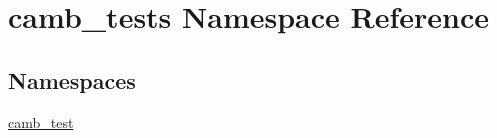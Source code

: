 \hypertarget{namespacecamb__tests}{}\section{camb\+\_\+tests Namespace Reference}
\label{namespacecamb__tests}
\subsection*{Namespaces}
\begin{DoxyCompactItemize}
\item 
 \mbox{\hyperlink{namespacecamb__tests_1_1camb__test}{camb\+\_\+test}}
\end{DoxyCompactItemize}
